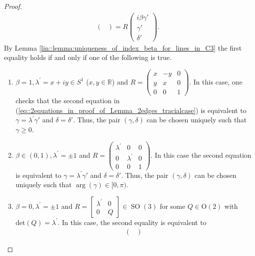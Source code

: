 \documentclass{amsart}
\newcommand{\R}{\mathbb{R}}
\DeclareMathOperator{\SO}{SO}
\begin{document}
\begin{proof}
\begin{align}
\begin{pmatrix}
            \end{pmatrix}
        = R
            \begin{pmatrix}
                i \beta \gamma' \\ \gamma' \\ \delta'
            \end{pmatrix}.
    \end{align}
    By Lemma \ref{lin::lemma:uniqueness_of_index_beta_for_lines_in_C3} the first equality holds if and only if one of the following is true.
    \begin{enumerate}[label=(\alph*)]
        \item $\beta = 1, \lambda^\prime = x + iy \in S^1$ ($x,y\in\R$) and $\displaystyle R = \begin{pmatrix}
            x & -y & 0 \\
            y & x & 0 \\
            0 & 0 & 1
        \end{pmatrix}$. In this case, one checks that the second equation in (\ref{eq::2equations_in_proof_of_Lemma_2edges_tracialcase}) is equivalent to $\gamma=\lambda^\prime\gamma'$ and $\delta=\delta'$. Thus, the pair $(\gamma, \delta)$ can be chosen uniquely such that $\gamma \geq 0$.
        \item 
        $\beta \in (0,1), \lambda^\prime = \pm 1$ and $\displaystyle R = \begin{pmatrix}
            \lambda^\prime & 0 & 0 \\
            0 & \lambda^\prime & 0 \\
            0 & 0 & 1
        \end{pmatrix}$.
        In this case the second equation is equivalent to $\gamma=\lambda^\prime\gamma'$ and $\delta=\delta'$. Thus, the pair $(\gamma, \delta)$ can be chosen uniquely such that $\arg(\gamma)\in[0,\pi)$.
        \item 
        $\beta = 0, \lambda^\prime = \pm 1$ and $\displaystyle R = \left[\begin{array}{c|c}
            \lambda^\prime  & 0 \\ \hline
            0 & Q
        \end{array}\right]
        \in\SO(3)$
        for some $Q \in \mathrm{O}(2)$ with $\mathrm{det}(Q) = \lambda^\prime$. In this case, the second equality is equivalent to
        \begin{align*}
            \begin{pmatrix}

\end{pmatrix}
\end{align*}
\end{enumerate}
\end{proof}
\end{document}

